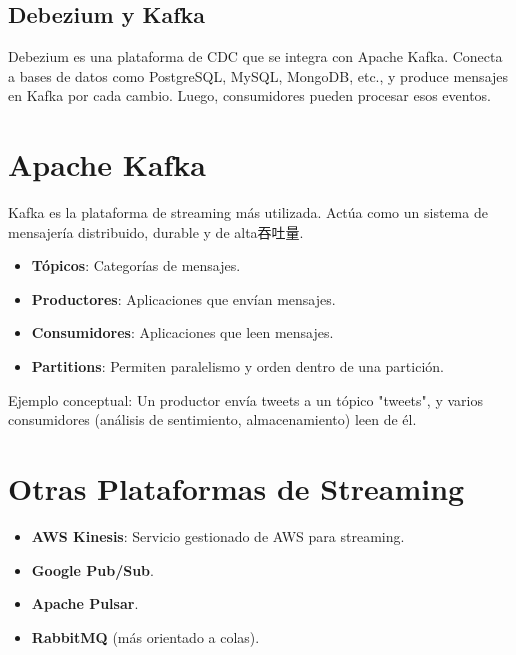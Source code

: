 \documentclass[12pt,a4paper,openany,oneside]{book}
\begin{document}
\subsection{Debezium y Kafka}
Debezium es una plataforma de CDC que se integra con Apache Kafka. Conecta a bases de datos como PostgreSQL, MySQL, MongoDB, etc., y produce mensajes en Kafka por cada cambio. Luego, consumidores pueden procesar esos eventos.

\begin{center}
\end{center}

\section{Apache Kafka}
Kafka es la plataforma de streaming más utilizada. Actúa como un sistema de mensajería distribuido, durable y de alta吞吐量.

\begin{itemize}
    \item \textbf{Tópicos}: Categorías de mensajes.
    \item \textbf{Productores}: Aplicaciones que envían mensajes.
    \item \textbf{Consumidores}: Aplicaciones que leen mensajes.
    \item \textbf{Partitions}: Permiten paralelismo y orden dentro de una partición.
\end{itemize}

Ejemplo conceptual: Un productor envía tweets a un tópico "tweets", y varios consumidores (análisis de sentimiento, almacenamiento) leen de él.

\section{Otras Plataformas de Streaming}
\begin{itemize}
    \item \textbf{AWS Kinesis}: Servicio gestionado de AWS para streaming.
    \item \textbf{Google Pub/Sub}.
    \item \textbf{Apache Pulsar}.
    \item \textbf{RabbitMQ} (más orientado a colas).
\end{itemize}
\end{document}
